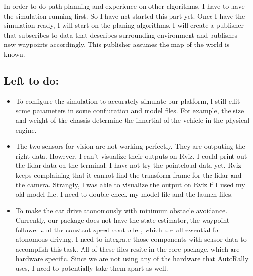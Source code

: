 \documentclass[compsoc,draftclsnofoot,onecolumn,10pt]{IEEEtran}
\begin{document}
In order to do path planning and experience on other algorithms, I have to have the simulation running first. So I have not started this part yet. Once I have the simulation ready, I will start on the planing algorithms. I will create a publisher that subscribes to data that describes surrounding environment and publishes new waypoints accordingly. This publisher assumes the map of the world is known.

\subsection{Left to do:}
\begin{itemize}
	\item To configure the simulation to accurately simulate our platform, I still edit some parameters in some confiuration and model files. For example, the size and weight of the chassis determine the innertial of the vehicle in the physical engine.  
	\item The two sensors for vision are not working perfectly. They are outputing the right data. However, I can't visualize their outputs on Rviz. I could print out the lidar data on the terminal. I have not try the pointcloud data yet. Rviz keeps complaining that it cannot find the transform frame for the lidar and the camera. Strangly, I was able to visualize the output on Rviz if I used my old model file. I need to double check my model file and the launch files. 
	\item To make the car drive atonomously with minimum obstacle avoidance. Currently, our package does not have the state estimator, the waypoint follower and the constant speed controller, which are all essential for atonomous driving. I need to integrate those components with sensor data to accomplish this task. All of these files resite in the core package, which are hardware specific. Since we are not using any of the hardware that AutoRally uses, I need to potentially take them apart as well. 
\end{itemize}
\end{document}
